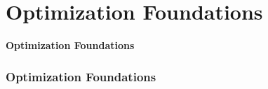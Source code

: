 \section{Optimization Foundations}
\begin{frame}[plain, c]
    \begin{center}
        \Huge \textcolor{NavyBlue}{\textbf{Optimization Foundations}}
    \end{center}
\end{frame}

\begin{frame}
    \frametitle{Optimization Foundations}
\end{frame}